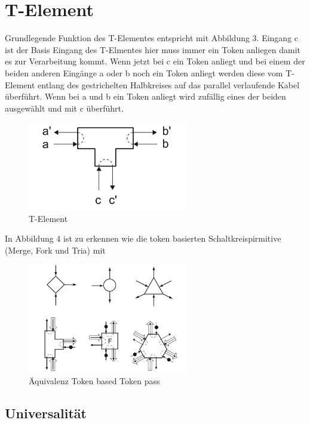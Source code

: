 \section{T-Element}
Grundlegende Funktion des T-Elementes entspricht mit Abbildung 3.
%
Eingang c ist der Basis Eingang des T-Elmentes hier muss immer ein Token
anliegen damit es zur Verarbeitung kommt.
%
Wenn jetzt bei c ein Token anliegt und bei einem der beiden anderen
Eingänge a oder b noch ein Token anliegt werden diese vom T-Element 
entlang des gestrichelten Halbkreises auf das parallel verlaufende 
Kabel überführt.
%
Wenn bei a und b ein Token anliegt wird zufällig 
eines der beiden ausgewählt und mit c überführt.

\begin{figure}[h]
    \centering
    \includegraphics[width=7cm]{bilder/T_Element.png}
    \caption{T-Element}
\end{figure}    

In Abbildung 4 ist zu erkennen wie die token basierten Schaltkreispirmitive 
(Merge, Fork und Tria) mit 

\begin{figure}[h]
    \centering
    \includegraphics[width=7cm]{bilder/BasedToPass.png}
    \caption{Äquivalenz Token based Token pass}
\end{figure}    

\subsection{Universalität}

